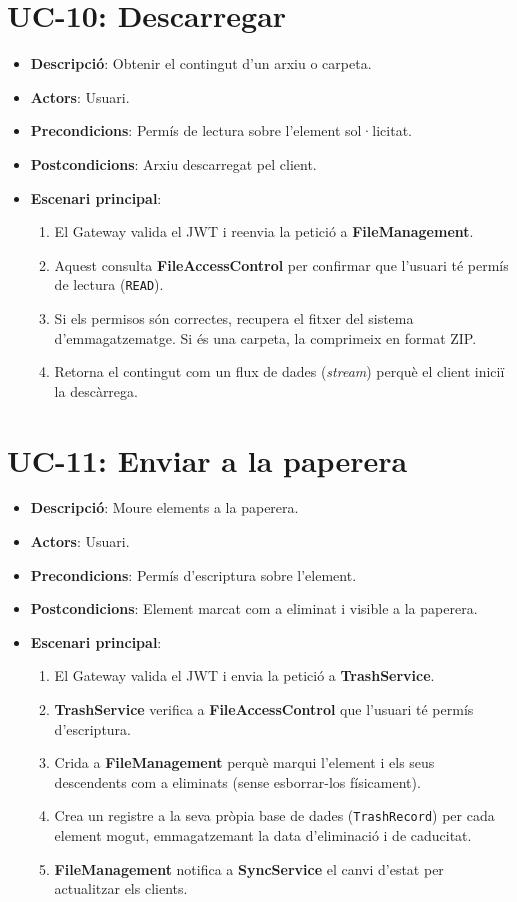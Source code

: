 \section{UC-10: Descarregar}
\begin{itemize}
  \item \textbf{Descripció}: Obtenir el contingut d'un arxiu o carpeta.
  \item \textbf{Actors}: Usuari.
  \item \textbf{Precondicions}: Permís de lectura sobre l'element sol·licitat.
  \item \textbf{Postcondicions}: Arxiu descarregat pel client.
  \item \textbf{Escenari principal}:
    \begin{enumerate}
        \item El Gateway valida el JWT i reenvia la petició a \textbf{FileManagement}.
        \item Aquest consulta \textbf{FileAccessControl} per confirmar que l'usuari té permís de lectura (\texttt{READ}).
        \item Si els permisos són correctes, recupera el fitxer del sistema d'emmagatzematge. Si és una carpeta, la comprimeix en format ZIP.
        \item Retorna el contingut com un flux de dades (\emph{stream}) perquè el client iniciï la descàrrega.
    \end{enumerate}
\end{itemize}

\section{UC-11: Enviar a la paperera}
\begin{itemize}
  \item \textbf{Descripció}: Moure elements a la paperera.
  \item \textbf{Actors}: Usuari.
  \item \textbf{Precondicions}: Permís d'escriptura sobre l'element.
  \item \textbf{Postcondicions}: Element marcat com a eliminat i visible a la paperera.
  \item \textbf{Escenari principal}:
      \begin{enumerate}
        \item El Gateway valida el JWT i envia la petició a \textbf{TrashService}.
        \item \textbf{TrashService} verifica a \textbf{FileAccessControl} que l'usuari té permís d'escriptura.
        \item Crida a \textbf{FileManagement} perquè marqui l'element i els seus descendents com a eliminats (sense esborrar-los físicament).
        \item Crea un registre a la seva pròpia base de dades (\texttt{TrashRecord}) per cada element mogut, emmagatzemant la data d'eliminació i de caducitat.
        \item \textbf{FileManagement} notifica a \textbf{SyncService} el canvi d'estat per actualitzar els clients.
    \end{enumerate}
\end{itemize}

